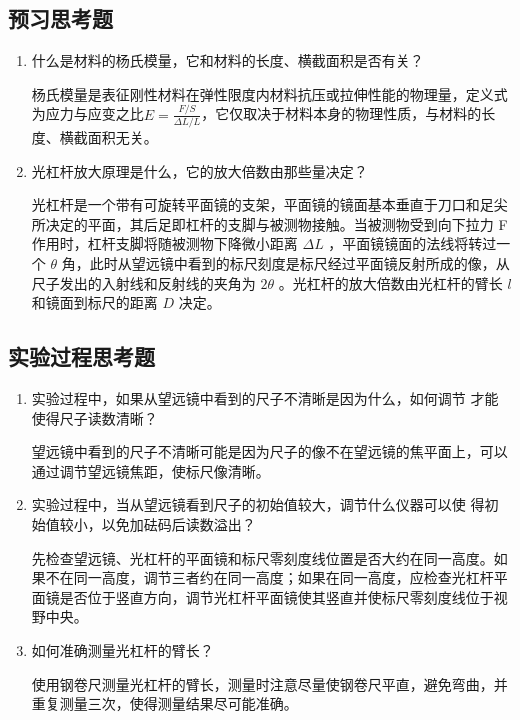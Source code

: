 \documentclass[a4paper]{extarticle}
\begin{document}
    \subsection{预习思考题}
    \begin{enumerate}
        \item 什么是材料的杨氏模量，它和材料的长度、横截面积是否有关？
        \par
        杨氏模量是表征刚性材料在弹性限度内材料抗压或拉伸性能的物理量，定义式为应力与应变之比$E=\frac{F/S}{\Delta L/L}$，它仅取决于材料本身的物理性质，与材料的长度、横截面积无关。
        \item 光杠杆放大原理是什么，它的放大倍数由那些量决定？
        \par
        光杠杆是一个带有可旋转平面镜的支架，平面镜的镜面基本垂直于刀口和足尖所决定的平面，其后足即杠杆的支脚与被测物接触。当被测物受到向下拉力 F 作用时，杠杆支脚将随被测物下降微小距离 $\Delta L$ ，平面镜镜面的法线将转过一个 $\theta$ 角，此时从望远镜中看到的标尺刻度是标尺经过平面镜反射所成的像，从尺子发出的入射线和反射线的夹角为 $2\theta$ 。光杠杆的放大倍数由光杠杆的臂长 $l$ 和镜面到标尺的距离 $D$ 决定。
    \end{enumerate}
    \subsection{实验过程思考题}
    \begin{enumerate}
        \item 实验过程中，如果从望远镜中看到的尺子不清晰是因为什么，如何调节
        才能使得尺子读数清晰？
        \par
        望远镜中看到的尺子不清晰可能是因为尺子的像不在望远镜的焦平面上，可以通过调节望远镜焦距，使标尺像清晰。
        \item 实验过程中，当从望远镜看到尺子的初始值较大，调节什么仪器可以使
        得初始值较小，以免加砝码后读数溢出？
        \par
        先检查望远镜、光杠杆的平面镜和标尺零刻度线位置是否大约在同一高度。如果不在同一高度，调节三者约在同一高度；如果在同一高度，应检查光杠杆平面镜是否位于竖直方向，调节光杠杆平面镜使其竖直并使标尺零刻度线位于视野中央。
        \item 如何准确测量光杠杆的臂长？
        \par
        使用钢卷尺测量光杠杆的臂长，测量时注意尽量使钢卷尺平直，避免弯曲，并重复测量三次，使得测量结果尽可能准确。
    \end{enumerate}
\end{document}
